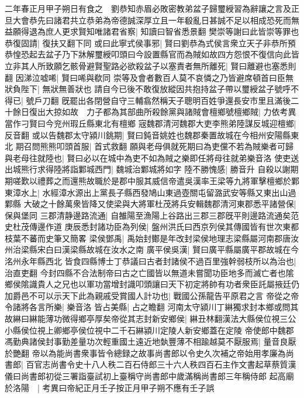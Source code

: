 二年春正月甲子朔日有食之　劉恭知赤眉必敗密教弟盆子歸璽綬習為辭讓之言及正旦大會恭先曰諸君共立恭弟為帝德誠深厚立且一年殽亂日甚誠不足以相成恐死而無益願得退為庶人更求賢知唯諸君省察|{
	知讀曰智省悉景翻}
樊崇等謝曰此皆崇等罪也恭復固請|{
	復扶又翻下同}
或曰此寧式侯事邪|{
	賢曰劉恭為式侯言衆立天子非恭所預}
恭惶恐起去盆子乃下牀解璽綬叩頭曰今設置縣官而為賊如故四方怨恨不復信向此皆立非其人所致願乞骸骨避賢聖路必欲殺盆子以塞責者無所離死|{
	賢曰離避也塞悉則翻}
因涕泣嘘唏|{
	賢曰唏與欷同}
崇等及會者數百人莫不哀憐之乃皆避席頓首曰臣無狀負陛下|{
	無狀無善狀也}
請自今已後不敢復放縱因共抱持盆子帶以璽綬盆子號呼不得已|{
	號戶刀翻}
旣罷出各閉營自守三輔翕然稱天子聰明百姓爭還長安市里且滿後二十餘日復出大掠如故　力子都為其部曲所殺餘黨與諸賊會檀鄉號檀鄉賊|{
	力依考異當作刁賢曰今兖州瑕丘縣東北有檀鄉}
宼魏郡清河魏郡大吏李熊弟陸謀反城迎檀鄉|{
	反音翻}
或以告魏郡太守潁川銚期|{
	賢曰鈍音姚姓也魏郡秦置故城在今相州安陽縣東北}
期召問熊熊叩頭首服|{
	首式救翻}
願與老母俱就死期曰為吏儻不若為賊樂者可歸與老母往就陸也|{
	賢曰必以在城中為吏不如為賊之樂即任將母往就弟樂音洛}
使吏送出城熊行求得陸將詣鄴城西門|{
	魏城治鄴城將如字}
陸不勝愧感|{
	勝音升}
自殺以謝期期嗟歎以禮葬之而還熊故職於是郡中服其威信帝遣吳漢率王梁等九將軍擊檀鄉於鄴東漳水上|{
	水經漳水源出上黨長子縣西發鳩山東過壺關屯留潞武安等縣又東出山過鄴縣}
大破之十餘萬衆皆降又使梁與大將軍杜茂將兵安輯魏郡清河東郡悉平諸營保|{
	保與堡同}
三郡清静邊路流通|{
	自雒陽至漁陽上谷路出三郡三郡旣平則邊路流通矣范史杜茂傳邊作道}
庚辰悉封諸功臣為列侯|{
	盤州洪氏曰西京列侯其傳國皆有世次東都枝葉不蕃而史筆又簡畧}
梁侯鄧禹|{
	禹始封鄼是年改封梁侯地理志梁縣屬河南郡唐汝州治梁縣宋白曰漢梁縣故城在汝水之南}
廣平侯吳漢|{
	賢曰廣平縣屬廣平郡故城在今洺州永年縣西北}
皆食四縣博士丁恭議曰古者封諸侯不過百里強幹弱枝所以為治也|{
	治直吏翻}
今封四縣不合法制帝曰古之亡國皆以無道未嘗聞功臣地多而滅亡者也隂鄉侯隂識貴人之兄也以軍功當增封識叩頭讓曰天下初定將帥有功者衆臣託屬掖廷仍加爵邑不可以示天下此為親戚受賞國人計功也|{
	戰國公孫龍告平原君之言}
帝從之帝令諸將各言所樂|{
	樂音洛}
皆占美縣|{
	占之瞻翻}
河南太守潁川丁綝獨求封本鄉或問其故綝曰綝能薄功微得鄉亭厚矣帝從其志封新安鄉侯|{
	綝丑林翻漢法大縣侯位視三公小縣侯位視上卿鄉亭侯位視中二千石綝潁川定陵人新安鄉蓋在定陵}
帝使郎中魏郡馮勤典諸侯封事勤差量功次輕重國土遠近地埶豐薄不相踰越莫不厭服焉|{
	量音良厭於艷翻}
帝以為能尚書衆事皆令總録之故事尚書郎以令史久次補之帝始用孝廉為尚書郎|{
	百官志尚書令史十八人秩二百石侍郎三十六人秩四百石主作文書起草蔡質漢儀曰尚書郎初從三署詣臺試初上臺稱守尚書郎中歲滿稱尚書郎三年稱侍郎}
起高廟於洛陽　|{
	考異曰帝紀正月壬子按正月甲子朔不應有壬子誤}
